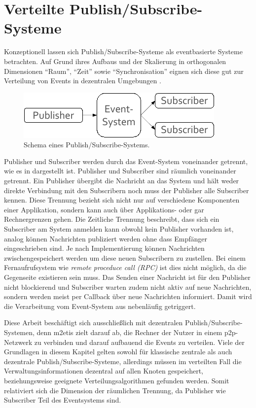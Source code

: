 \section{Verteilte Publish/Subscribe-Systeme}
\label{chap:grundlagen:pubsub}
Konzeptionell lassen sich Publish/Subscribe-Systeme als eventbasierte Systeme betrachten. Auf Grund ihres Aufbaus und der Skalierung  in orthogonalen Dimensionen \enquote{Raum}, \enquote{Zeit} sowie \enquote{Synchronisation} eignen sich diese gut zur Verteilung von Events in dezentralen Umgebungen \cite{PatrickTh2003Many, Cugola2002Using}.

\begin{figure}[htbp]
\centering
\includegraphics{grafics/pubsub_black_box.pdf}
\caption{Schema eines Publish/Subscribe-Systems.}
\label{fig:pubsub_black_box}
\end{figure}

Publisher und Subscriber werden durch das Event-System voneinander getrennt, wie es in  dargestellt ist.  Publisher und Subscriber sind räumlich voneinander getrennt. Ein Publisher übergibt die Nachricht an das System und hält weder direkte Verbindung mit den Subscribern noch muss der Publisher alle Subscriber kennen. Diese Trennung bezieht sich nicht nur auf verschiedene Komponenten einer Applikation, sondern kann auch über Applikations- oder gar Rechnergrenzen gehen. Die Zeitliche Trennung beschreibt, dass sich ein Subscriber am System anmelden kann obwohl kein Publisher vorhanden ist, analog können Nachrichten publiziert werden ohne dass Empfänger eingeschrieben sind. Je nach Implementierung können Nachrichten zwischengespeichert werden um diese neuen Subscribern zu zustellen. Bei einem Fernaufrufsystem wie \emph{remote proceduce call (RPC)} \cite{Birrell1984Implementing} ist dies nicht möglich, da die Gegenseite existieren sein muss. Das Senden einer Nachricht ist für den Publisher nicht blockierend und Subscriber warten zudem nicht aktiv auf neue Nachrichten, sondern werden meist per Callback über neue Nachrichten informiert. Damit wird die Verarbeitung vom Event-System aus nebenläufig getriggert.

Diese Arbeit beschäftigt sich ausschließlich mit dezentralen Publish/Subscribe-Sys\-temen, denn \ac{m2etis} zielt darauf ab, die Rechner der Nutzer in einem p2p-Netzwerk zu verbinden und darauf aufbauend die Events zu verteilen. Viele der Grundlagen in diesem Kapitel gelten sowohl für klassische zentrale als auch dezentrale Publish/Subscribe-Systeme, allerdings müssen im verteilten Fall die Verwaltungsinformationen dezentral auf allen Knoten gespeichert, beziehungsweise geeignete Verteilungsalgorithmen gefunden werden. Somit relativiert sich die Dimension der räumlichen Trennung, da Publisher wie Subscriber Teil des Eventsystems sind.

